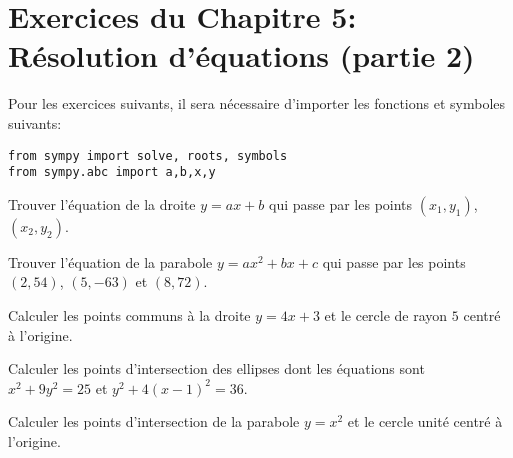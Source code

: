 
\section*{Exercices du Chapitre 5: Résolution d'équations (partie 2)}

Pour les exercices suivants, il sera nécessaire d'importer les fonctions
et symboles suivants:
\begin{verbatim}
from sympy import solve, roots, symbols
from sympy.abc import a,b,x,y
\end{verbatim}

\begin{exercice}
Trouver l'équation de la droite $y=ax+b$ qui passe par les points
$(x_1,y_1)$, $(x_2,y_2)$.
\end{exercice}

\begin{exercice}
Trouver l'équation de la parabole $y=ax^2+bx+c$ qui passe par les points
$(2,54)$, $(5,-63)$ et $(8,72)$.
\end{exercice}

\begin{exercice}
Calculer les points communs à la droite $y=4x+3$ et le cercle de rayon $5$
centré à l'origine.
\end{exercice}

\begin{exercice}
Calculer les points d'intersection des ellipses dont les équations sont
$x^{2} + 9 y^{2} = 25$ et $y^{2} + 4 \left(x - 1\right)^{2} = 36$.
\end{exercice}

\begin{exercice}
Calculer les points d'intersection de la parabole $y=x^2$ et le cercle unité
centré à l'origine.
\end{exercice}







